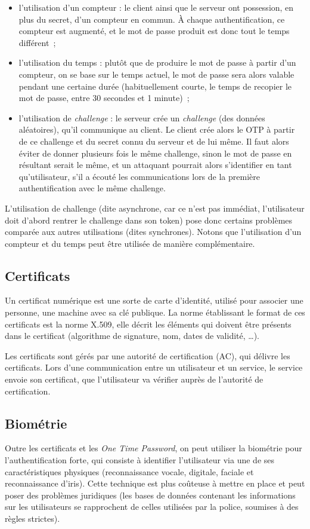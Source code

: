 \begin{itemize}
  \item l'utilisation d'un compteur : le client ainsi que le
serveur ont possession, en plus du secret, d'un compteur en
commun. À chaque authentification, ce compteur est augmenté, et le
mot de passe produit est donc tout le temps différent~;
  \item l'utilisation du temps : plutôt que de produire le mot de
passe à partir d'un compteur, on se base sur le temps actuel, le
mot de passe sera alors valable pendant une certaine durée
(habituellement courte, le temps de recopier le mot de passe, 
 entre 30 secondes et 1 minute)~;
  \item l'utilisation de \emph{challenge} : le serveur crée un
\emph{challenge} (des données aléatoires), qu'il communique au
client. Le client crée alors le OTP à partir de ce challenge et du
secret connu du serveur et de lui même. Il faut alors éviter de
donner plusieurs fois le même challenge, sinon le mot de passe en
résultant serait le même, et un attaquant pourrait alors
s'identifier en tant qu'utilisateur, s'il a écouté les
communications lors de la première authentification avec le même
challenge. 
\\
\end{itemize}

L'utilisation de challenge (dite asynchrone, car ce n'est pas
immédiat, l'utilisateur doit d'abord rentrer le challenge dans 
son token) pose donc certains problèmes comparée aux autres 
utilisations (dites synchrones). Notons que 
l'utilisation d'un compteur et du temps peut être utilisée de
manière complémentaire.


\subsection{Certificats}
Un certificat numérique est une sorte de carte d'identité,
utilisé pour associer une personne, une machine avec sa clé
publique.
La norme établissant le format de ces certificats est la norme
X.509, elle décrit les éléments qui doivent être présents dans le
certificat (algorithme de signature, nom, dates de validité, …).

Les certificats sont gérés par une autorité de certification (AC),
qui délivre les certificats.
Lors d'une communication entre un utilisateur et un service,
le service envoie son certificat, que l'utilisateur va vérifier
auprès de l'autorité de certification.


\subsection{Biométrie}
Outre les certificats et les \emph{One Time Password}, on peut
utiliser la biométrie pour l'authentification forte, qui consiste
à identifier l'utilisateur via une de ses caractéristiques
physiques (reconnaissance vocale, digitale, faciale et
reconnaissance d'iris).
Cette technique est plus coûteuse à mettre en place et peut poser
des problèmes juridiques (les bases de données contenant les
informations sur les utilisateurs se rapprochent de celles
utilisées par la police, soumises à des règles strictes).
